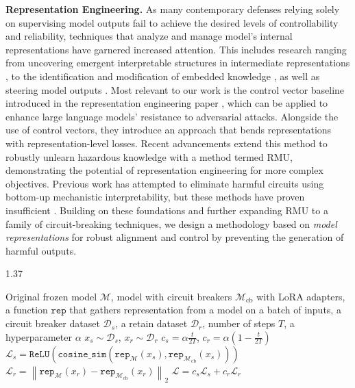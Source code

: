 \textbf{Representation Engineering.} \quad
As many contemporary defenses relying solely on supervising model outputs fail to achieve the desired levels of controllability and reliability, techniques that analyze and manage model's internal representations have garnered increased attention. This includes research ranging from uncovering emergent interpretable structures in intermediate representations \citep{zou2023representation, mikolov2013efficient, caron2021emerging}, to the identification and modification of embedded knowledge \citep{mitchell2021fast, meng2022locating, meng2022mass}, as well as steering model outputs \citep{upchurch2017deep, bau2020semantic, ling2021editgan, ilharco2022editing, turner2023activation}. Most relevant to our work is the control vector baseline introduced in the representation engineering paper \citep{zou2023representation}, which can be applied to enhance large language models' resistance to adversarial attacks. Alongside the use of control vectors, they introduce an approach that bends representations with representation-level losses. Recent advancements extend this method to robustly unlearn hazardous knowledge \citep{li2024wmdp} with a method termed RMU, demonstrating the potential of representation engineering for more complex objectives. Previous work has attempted to eliminate harmful circuits using bottom-up mechanistic interpretability, but these methods have proven insufficient \citep{li2023cb}. Building on these foundations and further expanding RMU to a family of circuit-breaking techniques, we design a methodology based on \emph{model representations} for robust alignment and control by preventing the generation of harmful outputs.


\begin{algorithm}[t]
\begin{spacing}{1.37}
\caption{LoRRA (RepE method) with Representation Rerouting (RR) Loss}
\label{alg:lorra}
\begin{algorithmic}[1]
\Require Original frozen model $\mathcal{M}$, model with circuit breakers $\mathcal{M}_{\text{cb}}$ with LoRA adapters, a function $\texttt{rep}$ that gathers representation from a model on a batch of inputs, a circuit breaker dataset $\mathcal{D}_s$, a retain dataset $\mathcal{D}_r$, number of steps $T$, a hyperparameter $\alpha$
    \State $x_s \sim \mathcal{D}_s$, $x_r \sim \mathcal{D}_r$ 
    \State $c_s = \alpha \frac{t}{2T}$, $c_r = \alpha (1 - \frac{t}{2T})$ 
    \State $\mathcal{L}_s = \texttt{ReLU} \left(\texttt{cosine\_sim}\left(\texttt{rep}_\mathcal{M} \left(x_s \right), \texttt{rep}_{\mathcal{M}_{\text{cb}}} \left(x_s \right)\right) \right)$ 
    \State $\mathcal{L}_r = \left\| \texttt{rep}_\mathcal{M} \left(x_r \right) - \texttt{rep}_{\mathcal{M}_{\text{cb}}} \left(x_r \right) \right\|_2$ 
    \State $\mathcal{L} = c_s \mathcal{L}_s + c_r \mathcal{L}_r$ 
\EndFor
\end{algorithmic}
\end{spacing}
\vspace{-5pt}
\end{algorithm}

